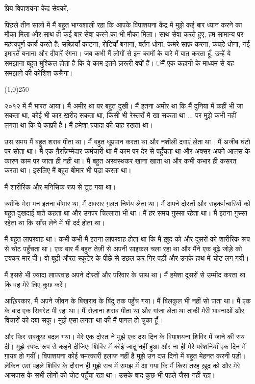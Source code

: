 \documentclass{article}
\begin{document}
प्रिय विपाशयना केंद्र सेवकों,

पिछले तीन सालों में मैं बहुत भाग्यशाली रहा कि आपके विपाशयना केंद्र में मुझे कई बार ध्यान करने का मौका मिला और साथ
ही कई बार सेवा करने का भी मौका मिला। साथ सेवा करते हुए, हम सामान्य पर महत्यपूर्ण कार्य करते हैं: सब्ज़ियाँ काटना, रोटियाँ
बनाना, बर्तन धोना, कमरे साफ़ करना, कपड़े धोना, नई इमारतें बनाना और दीवारें रंगना। जब कभी मैं
लोगों से इन कामों के बारे में बात करता हूँ, उन्हें ये समझाना बहुत मुश्किल होता है कि ये काम इतने ज़रूरी क्यों हैं।
ंमैं एक कहानी के माध्यम से यह समझाने की कोशिश करूँगा।


\begin{center}
\line(1,0){250}
\end{center}

२०१२ में मैं भारत आया। मैं अमीर था पर बहुत दुखी। मैं इतना अमीर था कि मैं दुनिया में कहीं भी जा सकता
था, कोई भी कार ख़रीद सकता था, किसी भी रेस्तराँ में खा सकता था ... पर मुझे कभी
नहीं लगता था कि ये काफ़ी है। मैं हमेशा ज़्यादा की चाह रखता था।

उस समय मैं बहुत शराब पीता था। मैं बहुत धूम्रपान करता था और नशीली दवाएं लेता था। मैं अजीब घंटो पर सोता
था। मैं एक ग़ैरज़िम्मेदार कर्मचारी था \textemdash मैं काम पर देर से पहुँचता था और अक्सर अपने आलस के कारण
काम पर जाता ही नहीं था। मैं बहुत अस्वस्थकर खाना खाता था और कभी कभार ही कसरत करता था। इसलिए मैं
बहुत बीमार भी पड़ा करता था।

मैं शारीरिक और मनिसिक रूप से टूट गया था।

क्योंकि मेरा मन इतना बीमार था, मैं अक्सर ग़लत निर्णय लेता था। मैं अपने दोस्तों और सहकर्मचारियों को बहुत
दुखदाई बातें कहता था और उनपर चिल्लाता भी था। मैं हर समय ग़ुस्सा रहेता था। मैं इतना ग़ुस्सा रहेता था
कि साँस लेने में भी दर्द होता था।

मैं बहुत लापरवाह था। कभी कभी मैं इतना लापरवाह होता था कि मैं ख़ुद को और दूसरों को शारीरिक रूप से
चोट पहुँचता था। एक बार मैं बहुत तेज़ी से अपनी साइकल चला रहा था और मैंने एक बूढ़े जोड़े को टक्कर मार दी। वो बूढ़ी औरत स्कूटेर के पीछे से उछल कर गिर पड़ीं और उनके हाथ में चोट लग गयी।

मैं इससे भी ज़्यादा लापरवाह अपने दोस्तों और
परिवार के साथ था। मैं हमेशा दूसरों से उम्मीद करता था कि वह मेरे लिए कुछ करें।

आख़िरकार, मैं अपने जीवन के बिखराव के बिंदु तक पहुँच गया। मैं बिलकुल भी नहीं सो पाता था। मैं एक के
बाद एक सिगरेट पी रहा था। मैं रोज़ाना शराब पीता था और गांजा लेता था ताकी मेरी भावनाओं और विचारों
को दबा सकू। मुझे एसा लगता था की मैं पागल हो चुका हूँ।

और फिर सबकुछ बदल गया। मेरे एक दोस्त ने मुझे एक दस दिन के विपाशयना शिविर में जाने की राय दी। मुझे स्पष्ट
रूप से कहने दीजिए: शिविर में कोई जादू नहीं हुआ और ना ही मेरे परेशनियाँ एक दिन में ग़ायब हो गयीं।
विपाशयना कोई चमत्कारी इलाज नहीं है \textemdash मुझे उन दस दिनो में बहुत मेहनत करनी पड़ी। लेकिन उस पहले
शिविर के दौरान ही मुझे सच में समझ में आ गया कि मैं किस तरह ख़ुद को और मेरे आसपास के सभी लोगों को चोट
पहुँचा रहा था। उसके बाद कुछ भी पहले जैसा नहीं रहा।
\end{document}

